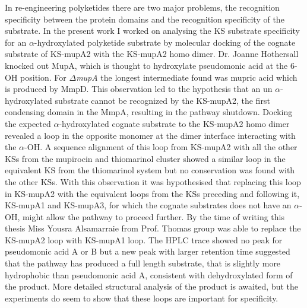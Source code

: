	In re-engineering polyketides there are two major problems, the recognition specificity between the protein domains and the recognition specificity of the substrate. In the present work I worked on analysing the KS substrate specificity for an $ \alpha $-hydroxylated polyketide substrate by molecular docking of the cognate substrate of KS-mupA2 with the KS-mupA2 homo dimer. Dr. Joanne Hothersall knocked out MupA, which is thought to hydroxylate pseudomonic acid at the 6-OH position. For $ \Delta $\textit{mupA} the longest intermediate found was mupric acid which is produced by MmpD. This observation led to the hypothesis that an un $ \alpha $-hydroxylated substrate cannot be recognized by the KS-mupA2, the first condensing domain in the MmpA, resulting in the pathway shutdown. Docking the expected $ \alpha $-hydroxylated cognate substrate to the KS-mupA2 homo dimer revealed a loop in the opposite monomer at the dimer interface interacting with the $ \alpha $-OH. A sequence alignment of this loop from KS-mupA2 with all the other KSs from the mupirocin and thiomarinol cluster showed a similar loop in the equivalent KS from the thiomarinol system but no conservation was found with the other KSs. With this observation it was hypothesised that replacing this loop in KS-mupA2 with the equivalent loops from the KSs preceding and following it, KS-mupA1 and KS-mupA3, for which the cognate substrates does not have an $ \alpha $-OH, might allow the pathway to proceed further. By the time of writing this thesis Miss Yousra Alsamarraie from Prof. Thomas group was able to replace the KS-mupA2 loop with KS-mupA1 loop. The HPLC trace showed no peak for pseudomonic acid A or B but a new peak with larger retention time suggested that the pathway has produced a full length substrate, that is slightly more hydrophobic than pseudomonic acid A, consistent with dehydroxylated form of the product. More detailed structural analysis of the product is awaited, but the experiments do seem to show that these loops are important for specificity.

